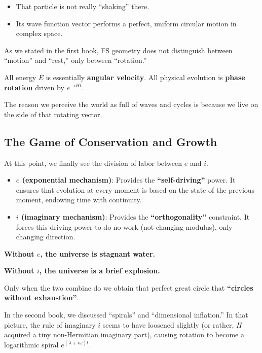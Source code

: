 \begin{itemize}
\item That particle is not really ``shaking'' there.

\item Its wave function vector performs a perfect, uniform circular motion in complex space.
\end{itemize}

As we stated in the first book, FS geometry does not distinguish between ``motion'' and ``rest,'' only between ``rotation.''

All energy $E$ is essentially \textbf{angular velocity}. All physical evolution is \textbf{phase rotation} driven by $e^{-iHt}$.

The reason we perceive the world as full of waves and cycles is because we live on the side of that rotating vector.

\subsection{The Game of Conservation and Growth}

At this point, we finally see the division of labor between \textbf{$e$} and \textbf{$i$}.

\begin{itemize}
\item \textbf{$e$ (exponential mechanism)}: Provides the \textbf{``self-driving''} power. It ensures that evolution at every moment is based on the state of the previous moment, endowing time with continuity.

\item \textbf{$i$ (imaginary mechanism)}: Provides the \textbf{``orthogonality''} constraint. It forces this driving power to do no work (not changing modulus), only changing direction.
\end{itemize}

\textbf{Without $e$, the universe is stagnant water.}

\textbf{Without $i$, the universe is a brief explosion.}

Only when the two combine do we obtain that perfect great circle that \textbf{``circles without exhaustion''}.

In the second book, we discussed ``spirals'' and ``dimensional inflation.'' In that picture, the rule of imaginary $i$ seems to have loosened slightly (or rather, $H$ acquired a tiny non-Hermitian imaginary part), causing rotation to become a logarithmic spiral $e^{(\lambda+i\omega)t}$.

